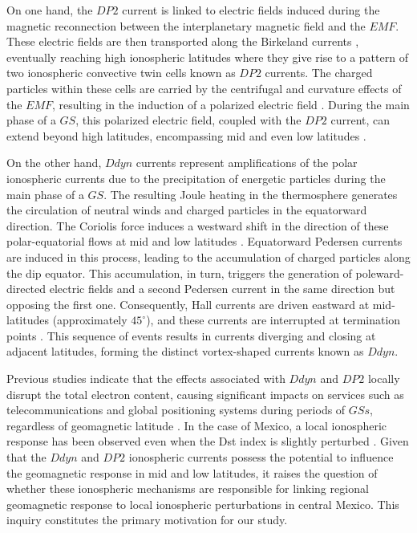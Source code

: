 \documentclass[a4paper,fleqn]{cas-dc}
\begin{document}
On one hand, the $DP2$ current is linked to electric fields induced during the magnetic reconnection between the interplanetary magnetic field and the $EMF$. These electric fields are then transported along the Birkeland currents \citep{dp2PPEF, dp2_diag}, eventually reaching high ionospheric latitudes where they give rise to a pattern of two ionospheric convective twin cells known as $DP2$ currents. The charged particles within these cells are carried by the centrifugal and curvature effects of the $EMF$, resulting in the induction of a polarized electric field \citep{Hepner_a, Hepner_b, Pudovkin, blanc_caudal, Denisenko}. During the main phase of a $GS$, this polarized electric field, coupled with the $DP2$ current, can extend beyond high latitudes, encompassing mid and even low latitudes \citep{nishida_66_knee, nishida_68_coherence, nishida_andobayashi_67}.

On the other hand, $Ddyn$ currents represent amplifications of the polar ionospheric currents due to the precipitation of energetic particles during the main phase of a $GS$. The resulting Joule heating in the thermosphere generates the circulation of neutral winds and charged particles in the equatorward direction. The Coriolis force induces a westward shift in the direction of these polar-equatorial flows at mid and low latitudes \citep{blanc_ddyn, ddyn2005, angeoddyn}. Equatorward Pedersen currents are induced in this process, leading to the accumulation of charged particles along the dip equator. This accumulation, in turn, triggers the generation of poleward-directed electric fields and a second Pedersen current in the same direction but opposing the first one. Consequently, Hall currents are driven eastward at mid-latitudes (approximately $45^\circ$), and these currents are interrupted at termination points \citep{blanc_ddyn}. This sequence of events results in currents diverging and closing at adjacent latitudes, forming the distinct vortex-shaped currents known as $Ddyn$.

Previous studies indicate that the effects associated with $Ddyn$ and $DP2$ locally disrupt the total electron content, causing significant impacts on services such as telecommunications and global positioning systems during periods of $GSs$, regardless of geomagnetic latitude \citep{mid-lat_ionocurrents,ionos1, signatures_of_eq_plasmabub}. In the case of Mexico, a local ionospheric response has been observed even when the Dst index is slightly perturbed \citep{dramaria_1, dramaria7}. Given that the $Ddyn$ and $DP2$ ionospheric currents possess the potential to influence the geomagnetic response in mid and low latitudes, it raises the question of whether these ionospheric mechanisms are responsible for linking regional geomagnetic response to local ionospheric perturbations in central Mexico. This inquiry constitutes the primary motivation for our study.
\end{document}
